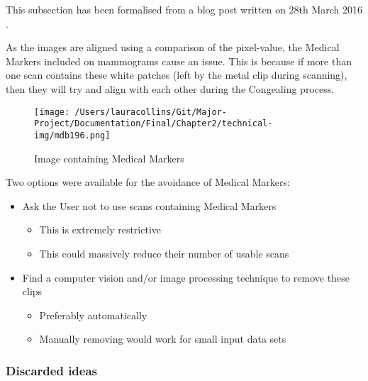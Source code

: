 This subsection has been formalised from a blog post written on 28th March 2016 \cite{Collins_2016}.

As the images are aligned using a comparison of the pixel-value, the Medical Markers included on mammograms cause an issue. This is because if more than one scan contains these white patches (left by the metal clip during scanning), then they will try and align with each other during the Congealing process.

\begin{figure}[H]
  \centering
  \texttt{[image: /Users/lauracollins/Git/Major-Project/Documentation/Final/Chapter2/technical-img/mdb196.png]}
  \caption{Image containing Medical Markers}
  \label{fig:med-markers}
\end{figure}

Two options were available for the avoidance of Medical Markers:
\begin{itemize}
  \item Ask the User not to use scans containing Medical Markers
  \begin{itemize}
    \item This is extremely restrictive
    \item This could massively reduce their number of usable scans
  \end{itemize}
  \item Find a computer vision and/or image processing technique to remove these clips
  \begin{itemize}
    \item Preferably automatically
    \item Manually removing would work for small input data sets
  \end{itemize}
\end{itemize}

\subsubsection{Discarded ideas}

